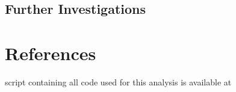 \documentclass[12pt]{article}\usepackage[]{graphicx}\usepackage[]{color}
\begin{document}
\subsection{Further Investigations}

\newpage
\section{References}
\begingroup
\renewcommand{\section}[2]{}%
\begin{flushleft}

%
%
%
%

\end{flushleft}
\endgroup

\newpage
\section{Appendix - R Code}

A script containing all code used for this analysis is available at \\

\singlespacing
\end{document}
